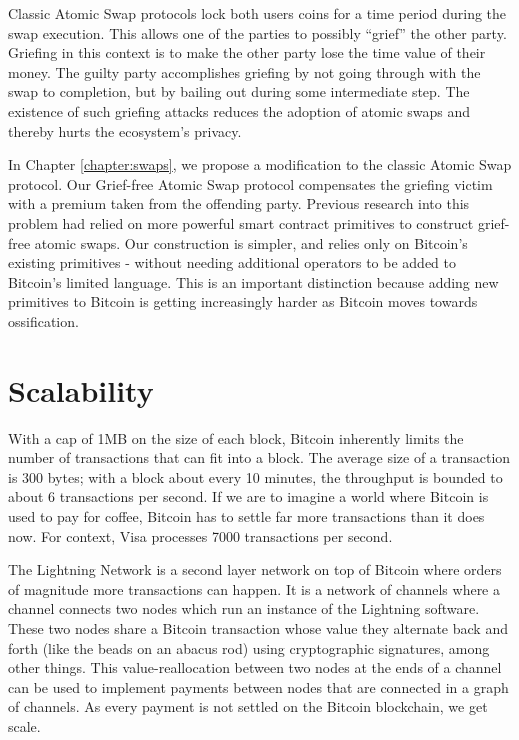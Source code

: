 Classic Atomic Swap protocols lock both users coins for a time period during the swap execution. This allows one of the parties to possibly ``grief'' the other party. Griefing in this context is to make the other party lose the time value of their money. The guilty party accomplishes griefing by not going through with the swap to completion, but by bailing out during some intermediate step. The existence of such griefing attacks reduces the adoption of atomic swaps and thereby hurts the ecosystem's privacy.

In Chapter \ref{chapter:swaps}, we propose a modification to the classic Atomic Swap protocol. Our Grief-free Atomic Swap protocol compensates the griefing victim with a premium taken from the offending party. Previous research into this problem had relied on more powerful smart contract primitives to construct grief-free atomic swaps. Our construction is simpler, and relies only on Bitcoin's existing primitives - without needing additional operators to be added to Bitcoin's limited language. This is an important distinction because adding new primitives to Bitcoin is getting increasingly harder as Bitcoin moves towards ossification. 

\section{Scalability}
With a cap of 1MB on the size of each block, Bitcoin inherently limits the number of transactions that can fit into a block. The average size of a transaction is 300 bytes; with a block about every 10 minutes, the throughput is bounded to about 6 transactions per second. If we are to imagine a world where Bitcoin is used to pay for coffee, Bitcoin has to settle far more transactions than it does now. For context, Visa processes 7000 transactions per second. 

The Lightning Network is a second layer network on top of Bitcoin where orders of magnitude more transactions can happen. It is a network of channels where a channel connects two nodes which run an instance of the Lightning software. These two nodes share a Bitcoin transaction whose value they alternate back and forth (like the beads on an abacus rod) using cryptographic signatures, among other things. This value-reallocation between two nodes at the ends of a channel can be used to implement payments between nodes that are connected in a graph of channels. As every payment is not settled on the Bitcoin blockchain, we get scale. 

